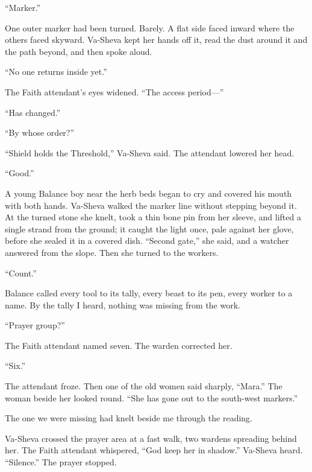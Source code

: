 ``Marker.''\par

One outer marker had been turned. Barely. A flat side faced inward where the others faced skyward. Va-Sheva kept her hands off it, read the dust around it and the path beyond, and then spoke aloud.\par

``No one returns inside yet.''\par
The Faith attendant's eyes widened. ``The access period---''\par
``Has changed.''\par
``By whose order?''\par
``Shield holds the Threshold,'' Va-Sheva said. The attendant lowered her head.\par
``Good.''\par

A young Balance boy near the herb beds began to cry and covered his mouth with both hands. Va-Sheva walked the marker line without stepping beyond it. At the turned stone she knelt, took a thin bone pin from her sleeve, and lifted a single strand from the ground; it caught the light once, pale against her glove, before she sealed it in a covered dish. ``Second gate,'' she said, and a watcher answered from the slope. Then she turned to the workers. \par

``Count.''\par

Balance called every tool to its tally, every beast to its pen, every worker to a name. By the tally I heard, nothing was missing from the work.\par

``Prayer group?'' \par

The Faith attendant named seven. The warden corrected her.

``Six.'' \par

The attendant froze. Then one of the old women said sharply, ``Mara.'' The woman beside her looked round. ``She has gone out to the south-west markers.'' \par

The one we were missing had knelt beside me through the reading.\par

Va-Sheva crossed the prayer area at a fast walk, two wardens spreading behind her. The Faith attendant whispered, ``God keep her in shadow.'' Va-Sheva heard. ``Silence.'' The prayer stopped.\par

